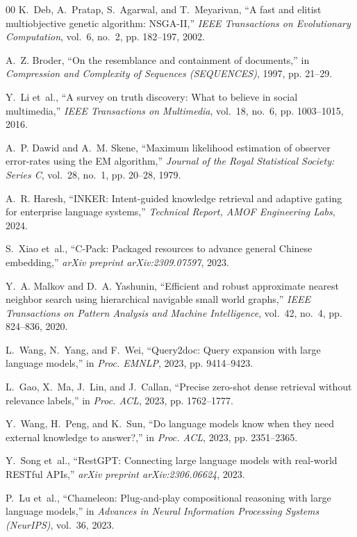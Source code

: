\documentclass[conference,onecolumn,10pt]{IEEEtran}
\begin{document}
\begin{thebibliography}{00}
K.~Deb, A.~Pratap, S.~Agarwal, and T.~Meyarivan, ``A fast and elitist multiobjective genetic algorithm: {NSGA-II},'' \textit{IEEE Transactions on Evolutionary Computation}, vol.~6, no.~2, pp. 182--197, 2002.

A.~Z. Broder, ``On the resemblance and containment of documents,'' in \textit{Compression and Complexity of Sequences (SEQUENCES)}, 1997, pp. 21--29.

Y.~Li et~al., ``A survey on truth discovery: What to believe in social multimedia,'' \textit{IEEE Transactions on Multimedia}, vol.~18, no.~6, pp. 1003--1015, 2016.

A.~P. Dawid and A.~M. Skene, ``Maximum likelihood estimation of observer error-rates using the {EM} algorithm,'' \textit{Journal of the Royal Statistical Society: Series C}, vol.~28, no.~1, pp. 20--28, 1979.

A.~R. Haresh, ``{INKER}: Intent-guided knowledge retrieval and adaptive gating for enterprise language systems,'' \textit{Technical Report, AMOF Engineering Labs}, 2024.

S.~Xiao et~al., ``{C-Pack}: Packaged resources to advance general Chinese embedding,'' \textit{arXiv preprint arXiv:2309.07597}, 2023.

Y.~A. Malkov and D.~A. Yashunin, ``Efficient and robust approximate nearest neighbor search using hierarchical navigable small world graphs,'' \textit{IEEE Transactions on Pattern Analysis and Machine Intelligence}, vol.~42, no.~4, pp. 824--836, 2020.

L.~Wang, N.~Yang, and F.~Wei, ``Query2doc: Query expansion with large language models,'' in \textit{Proc. EMNLP}, 2023, pp. 9414--9423.

L.~Gao, X.~Ma, J.~Lin, and J.~Callan, ``Precise zero-shot dense retrieval without relevance labels,'' in \textit{Proc. ACL}, 2023, pp. 1762--1777.

Y.~Wang, H.~Peng, and K.~Sun, ``Do language models know when they need external knowledge to answer?,'' in \textit{Proc. ACL}, 2023, pp. 2351--2365.

Y.~Song et~al., ``{RestGPT}: Connecting large language models with real-world {RESTful APIs},'' \textit{arXiv preprint arXiv:2306.06624}, 2023.

P.~Lu et~al., ``Chameleon: Plug-and-play compositional reasoning with large language models,'' in \textit{Advances in Neural Information Processing Systems (NeurIPS)}, vol.~36, 2023.


\end{thebibliography}
\end{document}
